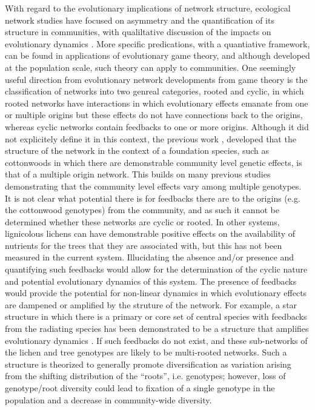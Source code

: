 \documentclass[11pt,twocolumn,twoside,lineno]{pnas-new}
\begin{document}
With regard to the evolutionary implications of network structure,
ecological network studies have focused on asymmetry and the
quantification of its structure in communities, with qualiltative
discussion of the impacts on evolutionary dynamics
\cite{Bascompte2006, Diaz-Castelazo2010, Guimaraes2011,
  Thompson2013}. More specific predications, with a quantiative
framework, can be found in applications of evolutionary game theory,
and although developed at the population scale, such theory can apply
to communities. One seemingly useful direction from evolutionary
network developments from game theory is the classification of
networks into two genreal categories, rooted and cyclic, in which
rooted networks have interactions in which evolutionary effects
emanate from one or multiple origins but these effects do not have
connections back to the origins, whereas cyclic networks contain
feedbacks to one or more origins. Although it did not explicitely
define it in this context, the previous work \citep{Lau2017a},
developed that the structure of the network in the context of a
foundation species, such as cottonwoods in which there are
demonstrable community level genetic effects, is that of a multiple
origin network. This builds on many previous studies demonstrating
that the community level effects vary among multiple genotypes. It is
not clear what potential there is for feedbacks there are to the
origins (e.g. the cottonwood genotypes) from the community, and as
such it cannot be determined whether these networks are cyclic or
rooted. In other systems, lignicolous lichens can have demonstrable
positive effects on the availability of nutrients for the trees that
they are associated with, but this has not been measured in the
current system. Illucidating the absence and/or presence and
quantifying such feedbacks would allow for the determination of the
cyclic nature and potential evolutionary dynamics of this system. The
presence of feedbacks would provide the potential for non-linear
dynamics in which evolutionary effects are dampened or amplified by
the struture of the network. For example, a star structure in which
there is a primary or core set of central species with feedbacks from
the radiating species has been demonstrated to be a structure that
amplifies evolutionary dynamics \cite{Lieberman2005}. If such
feedbacks do not exist, and these sub-networks of the lichen and tree
genotypes are likely to be multi-rooted networks. Such a structure is
theorized to generally promote diversification as variation arising
from the shifting distribution of the ``roots'', i.e. genotypes;
however, loss of genotype/root diversity could lead to fixation of a
single genotype in the population and a decrease in community-wide
diversity.
\end{document}
